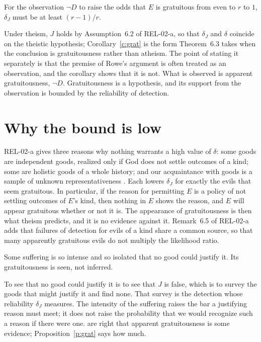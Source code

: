 \documentclass{situationist-preprint}
\begin{document}
\begin{corollary}\label{c:grat}
For the observation $\neg D$ to raise the odds that $E$ is gratuitous from even to $r$ to $1$, $\delta_J$ must be at least $(r-1)/r$.
\end{corollary}

Under theism, $J$ holds by Assumption~6.2 of REL-02-a, so that $\delta_J$ and $\delta$ coincide on the theistic hypothesis; Corollary~\ref{c:grat} is the form Theorem~6.3 takes when the conclusion is gratuitousness rather than atheism. The point of stating it separately is that the premise of Rowe's argument is often treated as an observation, and the corollary shows that it is not. What is observed is apparent gratuitousness, $\neg D$. Gratuitousness is a hypothesis, and its support from the observation is bounded by the reliability of detection.

\section{Why the bound is low}

REL-02-a gives three reasons why nothing warrants a high value of $\delta$: some goods are independent goods, realized only if God does not settle outcomes of a kind; some are holistic goods of a whole history; and our acquaintance with goods is a sample of unknown representativeness \citep{Bergmann2001}. Each lowers $\delta_J$ for exactly the evils that seem gratuitous. In particular, if the reason for permitting $E$ is a policy of not settling outcomes of $E$'s kind, then nothing in $E$ shows the reason, and $E$ will appear gratuitous whether or not it is. The appearance of gratuitousness is then what theism predicts, and it is no evidence against it. Remark~6.5 of REL-02-a adds that failures of detection for evils of a kind share a common source, so that many apparently gratuitous evils do not multiply the likelihood ratio.

\begin{objection}
Some suffering is so intense and so isolated that no good could justify it. Its gratuitousness is seen, not inferred.
\end{objection}

\begin{reply}
To see that no good could justify it is to see that $J$ is false, which is to survey the goods that might justify it and find none. That survey is the detection whose reliability $\delta_J$ measures. The intensity of the suffering raises the bar a justifying reason must meet; it does not raise the probability that we would recognize such a reason if there were one. \citet{BentonHawthorneIsaacs2016} are right that apparent gratuitousness is some evidence; Proposition~\ref{p:grat} says how much.
\end{reply}
\end{document}
